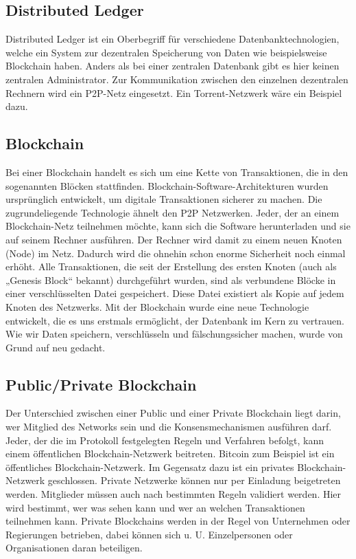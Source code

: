 \subsection{Distributed Ledger}
Distributed Ledger ist ein Oberbegriff für verschiedene Datenbanktechnologien, welche ein System zur dezentralen Speicherung von Daten wie beispielsweise Blockchain haben. Anders als bei einer zentralen Datenbank gibt es hier keinen zentralen Administrator. Zur Kommunikation zwischen den einzelnen dezentralen Rechnern wird ein P2P-Netz eingesetzt. Ein Torrent-Netzwerk wäre ein Beispiel dazu.
\subsection{Blockchain}
Bei einer Blockchain handelt es sich um eine Kette von Transaktionen, die in den sogenannten Blöcken stattfinden. Blockchain-Software-Architekturen wurden ursprünglich entwickelt, um digitale Transaktionen sicherer zu machen.
Die zugrundeliegende Technologie ähnelt den P2P Netzwerken.
Jeder, der an einem Blockchain-Netz teilnehmen möchte, kann sich die Software herunterladen und sie auf seinem Rechner ausführen. Der Rechner wird damit zu einem neuen Knoten (Node) im Netz. Dadurch wird die ohnehin schon enorme Sicherheit noch einmal erhöht. Alle Transaktionen, die seit der Erstellung des ersten Knoten (auch als „Genesis Block“ bekannt) durchgeführt wurden, sind als verbundene Blöcke in einer verschlüsselten Datei gespeichert. Diese Datei existiert als Kopie auf jedem Knoten des Netzwerks.
Mit der Blockchain wurde eine neue Technologie entwickelt, die es uns erstmals ermöglicht, der Datenbank im Kern zu vertrauen. Wie wir Daten speichern, verschlüsseln und fälschungssicher machen, wurde von Grund auf neu gedacht.
\subsection{Public/Private Blockchain}
Der Unterschied zwischen einer Public und einer Private Blockchain liegt darin, wer Mitglied des Networks sein und die Konsensmechanismen ausführen darf.
Jeder, der die im Protokoll festgelegten Regeln und Verfahren befolgt, kann einem öffentlichen Blockchain-Netzwerk beitreten.
Bitcoin zum Beispiel ist ein öffentliches Blockchain-Netzwerk.
Im Gegensatz dazu ist ein privates Blockchain-Netzwerk geschlossen. Private Netzwerke können nur per Einladung beigetreten werden. Mitglieder müssen auch nach bestimmten Regeln validiert werden. Hier wird bestimmt, wer was sehen kann und wer an welchen Transaktionen teilnehmen kann.
Private Blockchains werden in der Regel von Unternehmen oder Regierungen betrieben, dabei können sich u. U. Einzelpersonen oder Organisationen daran beteiligen.
